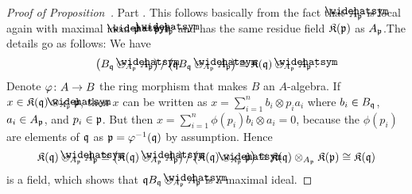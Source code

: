 \documentclass[a4paper,parskip=half,numbers=enddot, DIV=12]{scrreprt}
\begin{document}
\begin{proof}[Proof of Proposition~]
	Part . This follows basically from the fact that $\roof{A}_\pp$ is local again with maximal ideal $\roof{\pp}=\pp\roof{A}_\pp$ and has the same residue field $\mathfrak{K}(\mathfrak{p})$ as $A_{\mathfrak{p}}$.The details go as follows: We have
	\begin{align*}
	\left(B_\qq\otimes_{A_\pp}\roof{A}_\pp\right)/\left(\qq B_\qq\otimes_{A_\pp}\roof{A}_\pp\right)\cong \KK(\qq)\otimes_{A_\pp}\roof{A}_\pp\;.
	\end{align*}
	Denote $\phi\colon A\morphism B$ the ring morphism that makes $B$ an $A$-algebra. If $x\in \KK(\qq)\otimes_{A_\pp}\roof{\pp}$, then $x$ can be written as $x=\sum_{i=1}^{n}b_i\otimes p_ia_i$ where $b_i\in B_{\mathfrak{q}}$, $a_i\in A_{\mathfrak{p}}$, and $p_i\in \mathfrak{p}$. But then $x=\sum_{i=1}^{n}\phi(p_i)b_i\otimes a_i=0$, because the $\phi(p_i)$ are elements of $\mathfrak{q}$ as $\mathfrak{p}=\varphi^{-1}(\mathfrak{q})$ by assumption. Hence
	\begin{align*}
	\KK(\qq)\otimes_{A_\pp}\roof{A}_\pp\cong \left(\KK(\qq)\otimes_{A_\pp}\roof{A}_\pp\right)/\left(\KK(\qq)\otimes_{A_\pp}\roof{\pp}\right)\cong \KK(\qq)\otimes_{A_\pp}\KK(\pp)\cong \KK(\qq)
	\end{align*}
	is a field, which shows that $\qq B_\qq\otimes_{A_\pp}\roof{A}_\pp$ is a maximal ideal.
	

\end{proof}
\end{document}
